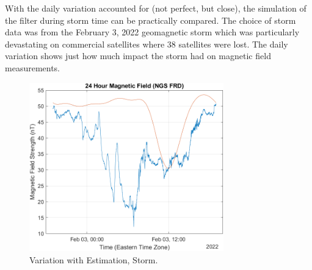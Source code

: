 \documentclass[conf]{new-aiaa}
\begin{document}
\begin{figure}[H]
\hfill
{}
\hfill
{}
\hfill
\end{figure}

With the daily variation accounted for (not perfect, but close), the simulation of the filter during storm time can be practically compared. The choice of storm data was from the February 3, 2022 geomagnetic storm which was particularly devastating on commercial satellites where 38 satellites were lost. The daily variation shows just how much impact the storm had on magnetic field measurements.

\begin{figure}[H]
\centering
\includegraphics[width=0.75\textwidth]{figures/temporal_storm_and_fit.png}
\caption{Variation with Estimation, Storm.}
\end{figure}
\end{document}
